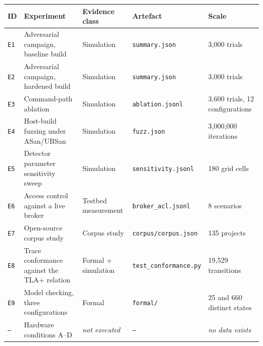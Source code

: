 \begin{longtable}{l p{} p{} p{} p{}}
\toprule
\textbf{ID} & \textbf{Experiment} & \textbf{Evidence class} & \textbf{Artefact} & \textbf{Scale} \\
\midrule
\endhead
\texttt{E1} & Adversarial campaign, baseline build & Simulation & \texttt{\footnotesize summary.json} & 3{,}000 trials \\
\texttt{E2} & Adversarial campaign, hardened build & Simulation & \texttt{\footnotesize summary.json} & 3{,}000 trials \\
\texttt{E3} & Command-path ablation & Simulation & \texttt{\footnotesize ablation.jsonl} & 3{,}600 trials, 12 configurations \\
\texttt{E4} & Host-build fuzzing under ASan/UBSan & Simulation & \texttt{\footnotesize fuzz.json} & 3{,}000{,}000 iterations \\
\texttt{E5} & Detector parameter sensitivity sweep & Simulation & \texttt{\footnotesize sensitivity.jsonl} & 180 grid cells \\
\texttt{E6} & Access control against a live broker & Testbed measurement & \texttt{\footnotesize broker\_acl.jsonl} & 8 scenarios \\
\texttt{E7} & Open-source corpus study & Corpus study & \texttt{\footnotesize corpus/corpus.json} & 135 projects \\
\texttt{E8} & Trace conformance against the TLA+ relation & Formal + simulation & \texttt{\footnotesize test\_conformance.py} & 19{,}529 transitions \\
\texttt{E9} & Model checking, three configurations & Formal & \texttt{\footnotesize formal/} & 25 and 660 distinct states \\
\texttt{---} & Hardware conditions A--D & \emph{not executed} & \texttt{\footnotesize ---} & \emph{no data exists} \\
\bottomrule
\end{longtable}

